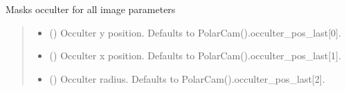 \documentclass[letterpaper,10pt,english]{sphinxmanual}
\begin{document}
\begin{fulllineitems}

\begin{fulllineitems}
\label{\detokenize{micropolarray:micropolarray.micropol_image.MicropolImage.mask_occulter}}
\pysigstartsignatures
{}
\pysigstopsignatures
\sphinxAtStartPar
Masks occulter for all image parameters
\begin{quote}\begin{description}
\begin{itemize}
\item {} 
\sphinxAtStartPar
{} (\sphinxstyleliteralemphasis{\sphinxupquote{, }}) \textendash{} Occulter y position. Defaults to PolarCam().occulter\_pos\_last{[}0{]}.

\item {} 
\sphinxAtStartPar
{} (\sphinxstyleliteralemphasis{\sphinxupquote{, }}) \textendash{} Occulter x position. Defaults to PolarCam().occulter\_pos\_last{[}1{]}.

\item {} 
\sphinxAtStartPar
{} (\sphinxstyleliteralemphasis{\sphinxupquote{, }}) \textendash{} Occulter radius. Defaults to PolarCam().occulter\_pos\_last{[}2{]}.


\end{itemize}
\end{description}
\end{quote}
\end{fulllineitems}
\end{fulllineitems}
\end{document}
